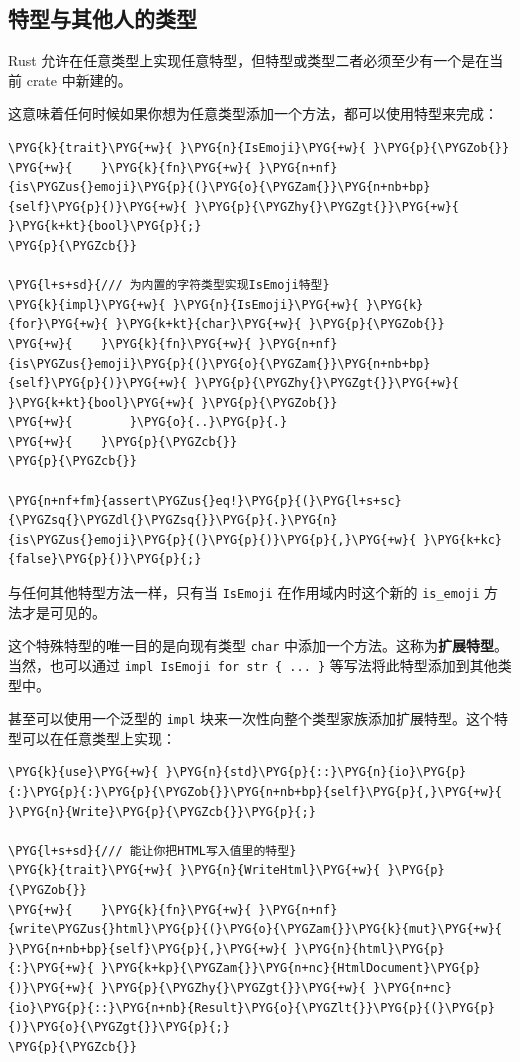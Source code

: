 \subsection{特型与其他人的类型}

Rust 允许在任意类型上实现任意特型，但特型或类型二者必须至少有一个是在当前 crate 中新建的。

这意味着任何时候如果你想为任意类型添加一个方法，都可以使用特型来完成：

\begin{Verbatim}[commandchars=\\\{\},breaklines=true,breakanywhere=true,fontsize=\codefont,xleftmargin=17bp]
\PYG{k}{trait}\PYG{+w}{ }\PYG{n}{IsEmoji}\PYG{+w}{ }\PYG{p}{\PYGZob{}}
\PYG{+w}{    }\PYG{k}{fn}\PYG{+w}{ }\PYG{n+nf}{is\PYGZus{}emoji}\PYG{p}{(}\PYG{o}{\PYGZam{}}\PYG{n+nb+bp}{self}\PYG{p}{)}\PYG{+w}{ }\PYG{p}{\PYGZhy{}\PYGZgt{}}\PYG{+w}{ }\PYG{k+kt}{bool}\PYG{p}{;}
\PYG{p}{\PYGZcb{}}

\PYG{l+s+sd}{/// 为内置的字符类型实现IsEmoji特型}
\PYG{k}{impl}\PYG{+w}{ }\PYG{n}{IsEmoji}\PYG{+w}{ }\PYG{k}{for}\PYG{+w}{ }\PYG{k+kt}{char}\PYG{+w}{ }\PYG{p}{\PYGZob{}}
\PYG{+w}{    }\PYG{k}{fn}\PYG{+w}{ }\PYG{n+nf}{is\PYGZus{}emoji}\PYG{p}{(}\PYG{o}{\PYGZam{}}\PYG{n+nb+bp}{self}\PYG{p}{)}\PYG{+w}{ }\PYG{p}{\PYGZhy{}\PYGZgt{}}\PYG{+w}{ }\PYG{k+kt}{bool}\PYG{+w}{ }\PYG{p}{\PYGZob{}}
\PYG{+w}{        }\PYG{o}{..}\PYG{p}{.}
\PYG{+w}{    }\PYG{p}{\PYGZcb{}}
\PYG{p}{\PYGZcb{}}

\PYG{n+nf+fm}{assert\PYGZus{}eq!}\PYG{p}{(}\PYG{l+s+sc}{\PYGZsq{}\PYGZdl{}\PYGZsq{}}\PYG{p}{.}\PYG{n}{is\PYGZus{}emoji}\PYG{p}{(}\PYG{p}{)}\PYG{p}{,}\PYG{+w}{ }\PYG{k+kc}{false}\PYG{p}{)}\PYG{p}{;}
\end{Verbatim}

与任何其他特型方法一样，只有当 \texttt{IsEmoji} 在作用域内时这个新的 \texttt{is\_emoji} 方法才是可见的。

这个特殊特型的唯一目的是向现有类型 \texttt{char} 中添加一个方法。这称为\textbf{扩展特型}。当然，也可以通过 \texttt{impl IsEmoji for str \{ ... \}} 等写法将此特型添加到其他类型中。

甚至可以使用一个泛型的 \texttt{impl} 块来一次性向整个类型家族添加扩展特型。这个特型可以在任意类型上实现：

\begin{Verbatim}[commandchars=\\\{\},breaklines=true,breakanywhere=true,fontsize=\codefont,xleftmargin=17bp]
\PYG{k}{use}\PYG{+w}{ }\PYG{n}{std}\PYG{p}{::}\PYG{n}{io}\PYG{p}{:}\PYG{p}{:}\PYG{p}{\PYGZob{}}\PYG{n+nb+bp}{self}\PYG{p}{,}\PYG{+w}{ }\PYG{n}{Write}\PYG{p}{\PYGZcb{}}\PYG{p}{;}

\PYG{l+s+sd}{/// 能让你把HTML写入值里的特型}
\PYG{k}{trait}\PYG{+w}{ }\PYG{n}{WriteHtml}\PYG{+w}{ }\PYG{p}{\PYGZob{}}
\PYG{+w}{    }\PYG{k}{fn}\PYG{+w}{ }\PYG{n+nf}{write\PYGZus{}html}\PYG{p}{(}\PYG{o}{\PYGZam{}}\PYG{k}{mut}\PYG{+w}{ }\PYG{n+nb+bp}{self}\PYG{p}{,}\PYG{+w}{ }\PYG{n}{html}\PYG{p}{:}\PYG{+w}{ }\PYG{k+kp}{\PYGZam{}}\PYG{n+nc}{HtmlDocument}\PYG{p}{)}\PYG{+w}{ }\PYG{p}{\PYGZhy{}\PYGZgt{}}\PYG{+w}{ }\PYG{n+nc}{io}\PYG{p}{::}\PYG{n+nb}{Result}\PYG{o}{\PYGZlt{}}\PYG{p}{(}\PYG{p}{)}\PYG{o}{\PYGZgt{}}\PYG{p}{;}
\PYG{p}{\PYGZcb{}}
\end{Verbatim}

